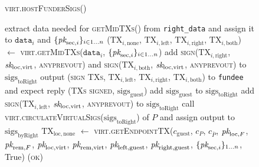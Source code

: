 \begin{figure}[H]
  \begin{processbox}{\textsc{virt.hostFunderSigs}()}
    \begin{algorithmic}[1]
        \State extract data needed for \textsc{getMidTXs}() from
        \texttt{right\_data} and assign it to $\texttt{data}_i$ and
        $\{\textit{pk}_{\mathrm{sec}, i}\}_{i \in 1 \dots n}$
        \State ($\mathrm{TX}_{i, \mathrm{none}}$, $\mathrm{TX}_{i,
        \mathrm{left}}$, $\mathrm{TX}_{i, \mathrm{right}}$, $\mathrm{TX}_{i,
        \mathrm{both}}$) $\gets$ \textsc{virt.getMidTXs}($\texttt{data}_i$,
        $\{\textit{pk}_{\mathrm{sec}, i}\}_{i \in 1 \dots n}$)
        \State add \textsc{sign}($\mathrm{TX}_{i, \mathrm{right}}$,
        $\textit{sk}_{\mathrm{loc}, \mathrm{virt}}$, \textsc{anyprevout}) and
        \textsc{sign}($\mathrm{TX}_{i, \mathrm{both}}$, $\textit{sk}_{\mathrm{loc},
        \mathrm{virt}}$, \textsc{anyprevout}) to
        $\mathrm{sigs}_{\mathrm{toRight}}$ 
        \State output (\textsc{sign TXs}, $\mathrm{TX}_{i, \mathrm{left}}$,
        $\mathrm{TX}_{i, \mathrm{right}}$, $\mathrm{TX}_{i, \mathrm{both}}$)
        to \texttt{fundee} and expect reply (\textsc{TXs signed},
        $\mathrm{sigs}_{\mathrm{guest}}$)
        \State add $\mathrm{sigs}_{\mathrm{guest}}$ to
        $\mathrm{sigs}_{\mathrm{toRight}}$
         
          \State add \textsc{sign}($\mathrm{TX}_{i, \mathrm{left}}$,
          $\textit{sk}_{\mathrm{loc}, \mathrm{virt}}$, \textsc{anyprevout}) to
          $\mathrm{sigs}_{\mathrm{toRight}}$
        \EndIf
      \EndFor
      \State call
      \textsc{virt.circulateVirtualSigs}($\mathrm{sigs}_{\mathrm{toRight}}$)
      of $P$ and assign output to $\mathrm{sigs}_{\mathrm{byRight}}$
      \State $\mathrm{TX}_{\mathrm{loc}, \mathrm{none}}$ $\gets$
      \textsc{virt.getEndpointTX}($c_{\mathrm{guest}}$, $c_P$, $c_{\bar{P}}$,
      $\textit{pk}_{\mathrm{loc}, F}$, $\textit{pk}_{\mathrm{rem}, F}$, $\textit{pk}_{\mathrm{loc},
      \mathrm{virt}}$, $\textit{pk}_{\mathrm{rem}, \mathrm{virt}}$, $\textit{pk}_{\mathrm{left},
      \mathrm{guest}}$, $\textit{pk}_{\mathrm{right}, \mathrm{guest}}$,
      $\{\textit{pk}_{\mathrm{sec}, i}\}_{1 \dots n}$, True)
      \label{code:virtual-layer:funder-sigs:tx-none}
      \State \Return (\textsc{ok})
    \end{algorithmic}
  \end{processbox}
  \caption{}
  \label{code:virtual-layer:funder-sigs}
\end{figure}

